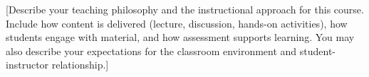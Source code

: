 [Describe your teaching philosophy and the instructional approach for this course. Include how content is delivered (lecture, discussion, hands-on activities), how students engage with material, and how assessment supports learning. You may also describe your expectations for the classroom environment and student-instructor relationship.]
